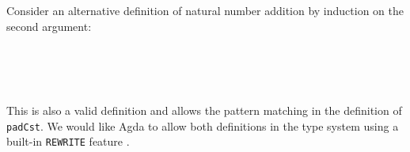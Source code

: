 \documentclass{l4proj}
\begin{document}
Consider an alternative definition of natural number addition by induction on the second argument:
\begin{code}%
\>[0]\<%
\\
\>[0]\AgdaSpace{}%
\AgdaSymbol{:}\AgdaSpace{}%
\AgdaSpace{}%
\AgdaSpace{}%
\AgdaSpace{}%
\AgdaSpace{}%
\<%
\\
\>[0]\AgdaSpace{}%
\AgdaSpace{}%
\AgdaSpace{}%
\AgdaSymbol{=}\AgdaSpace{}%
\<%
\\
\>[0]\AgdaSpace{}%
\AgdaSpace{}%
\AgdaSpace{}%
\AgdaSpace{}%
\AgdaSymbol{=}\AgdaSpace{}%
\AgdaSpace{}%
\AgdaSymbol{(}\AgdaSpace{}%
\AgdaSpace{}%
\AgdaSymbol{)}\<%
\end{code}
This is also a valid definition and allows the pattern matching in the definition of \texttt{padCst}. We would like Agda to allow both definitions in the type system using a built-in \texttt{REWRITE} feature \citep{cockx2019tame}. 
\end{document}
